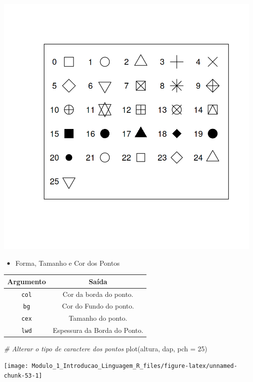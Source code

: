 \documentclass[
]{article}
\newenvironment{Shaded}{\begin{snugshade}}{\end{snugshade}}
\newcommand{\AttributeTok}[1]{\textcolor[rgb]{0.77,0.63,0.00}{#1}}
\newcommand{\CommentTok}[1]{\textcolor[rgb]{0.56,0.35,0.01}{\textit{#1}}}
\newcommand{\DecValTok}[1]{\textcolor[rgb]{0.00,0.00,0.81}{#1}}
\newcommand{\FunctionTok}[1]{\textcolor[rgb]{0.00,0.00,0.00}{#1}}
\newcommand{\NormalTok}[1]{#1}
\providecommand{\tightlist}{%
  \setlength{\itemsep}{0pt}\setlength{\parskip}{0pt}}
\begin{document}
\includegraphics{./data/pch-symbols.png}

\begin{itemize}
\tightlist
\item
  Forma, Tamanho e Cor dos Pontos
\end{itemize}

\begin{longtable}[]{@{}cc@{}}
\toprule()
Argumento & Saída \\
\midrule()
\endhead
\texttt{col} & Cor da borda do ponto. \\
\texttt{bg} & Cor do Fundo do ponto. \\
\texttt{cex} & Tamanho do ponto. \\
\texttt{lwd} & Espessura da Borda do Ponto. \\
\bottomrule()
\end{longtable}

\begin{Shaded}
\begin{Highlighting}[]
\CommentTok{\# Alterar o tipo de caractere dos pontos}
\FunctionTok{plot}\NormalTok{(altura, dap, }\AttributeTok{pch =} \DecValTok{25}\NormalTok{)}
\end{Highlighting}
\end{Shaded}

\begin{center}\texttt{[image: Modulo\_1\_Introducao\_Linguagem\_R\_files/figure-latex/unnamed-chunk-53-1]} \end{center}
\end{document}

